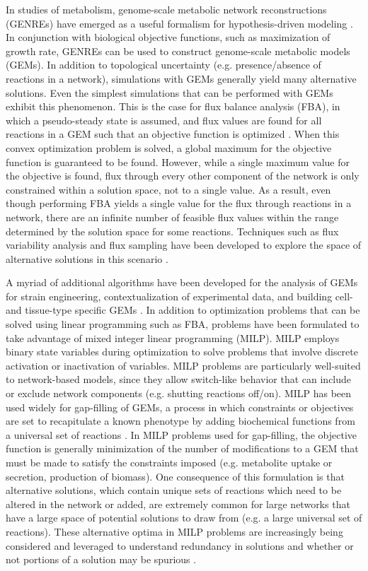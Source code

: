 \documentclass[11pt,twocolumn,notitlepage,openany,twoside]{book}
\begin{document}
\begin{refsection}
In studies of metabolism, genome-scale metabolic network reconstructions (GENREs) have emerged as a useful formalism for hypothesis-driven modeling \cite{Oberhardt2009-iu}. In conjunction with biological objective functions, such as maximization of growth rate, GENREs can be used to construct genome-scale metabolic models (GEMs). In addition to topological uncertainty (e.g. presence/absence of reactions in a network), simulations with GEMs generally yield many alternative solutions. Even the simplest simulations that can be performed with GEMs exhibit this phenomenon. This is the case for flux balance analysis (FBA), in which a pseudo-steady state is assumed, and flux values are found for all reactions in a GEM such that an objective function is optimized \cite{Orth2010-kl}. When this convex optimization problem is solved, a global maximum for the objective function is guaranteed to be found. However, while a single maximum value for the objective is found, flux through every other component of the network is only constrained within a solution space, not to a single value. As a result, even though performing FBA yields a single value for the flux through reactions in a network, there are an infinite number of feasible flux values within the range determined by the solution space for some reactions. Techniques such as flux variability analysis and flux sampling have been developed to explore the space of alternative solutions in this scenario \cite{Mahadevan2003-ah,Schellenberger2009-bj}.

A myriad of additional algorithms have been developed for the analysis of GEMs for strain engineering, contextualization of experimental data, and building cell- and tissue-type specific GEMs \cite{Blazier2012-oo,Machado2014-wi,Wang2017-sp}. In addition to optimization problems that can be solved using linear programming such as FBA, problems have been formulated to take advantage of mixed integer linear programming (MILP). MILP employs binary state variables during optimization to solve problems that involve discrete activation or inactivation of variables. MILP problems are particularly well-suited to network-based models, since they allow switch-like behavior that can include or exclude network components (e.g. shutting reactions off/on). MILP has been used widely for gap-filling of GEMs, a process in which constraints or objectives are set to recapitulate a known phenotype by adding biochemical functions from a universal set of reactions \cite{Reed2006-qv}. In MILP problems used for gap-filling, the objective function is generally minimization of the number of modifications to a GEM that must be made to satisfy the constraints imposed (e.g. metabolite uptake or secretion, production of biomass). One consequence of this formulation is that alternative solutions, which contain unique sets of reactions which need to be altered in the network or added, are extremely common for large networks that have a large space of potential solutions to draw from (e.g. a large universal set of reactions). These alternative optima in MILP problems are increasingly being considered and leveraged to understand redundancy in solutions and whether or not portions of a solution may be spurious \cite{Karp2018-hd,Robaina-Estevez2017-fy,Rossell2013-cf}.


\end{refsection}
\end{document}
